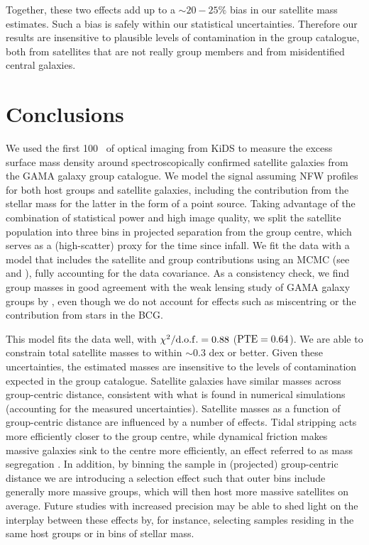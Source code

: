 Together, these two effects add up to a $\sim\!20-25\%$ bias in our satellite mass estimates. 
Such a bias is safely within our statistical uncertainties. Therefore our results are insensitive to 
plausible levels of contamination in the group catalogue, both from satellites that are not really 
group members and from misidentified central galaxies.


\section{Conclusions}\label{s:conclusions}

We used the first 100 \sqdeg\ of optical imaging from KiDS to measure the excess surface mass 
density around spectroscopically confirmed satellite galaxies from the GAMA galaxy group catalogue. 
We model the signal assuming NFW profiles for both host groups and satellite galaxies, including the 
contribution from the stellar mass for the latter in the form of a point source. Taking advantage of 
the combination of statistical power and high image quality, we split the satellite population into 
three bins in projected separation from the group centre, which serves as a (high-scatter) proxy for 
the time since infall. We fit the data with a model that includes the satellite and group 
contributions using an MCMC (see  and ), fully accounting for 
the data covariance. As a consistency check, we find group masses in good agreement with the weak 
lensing study of GAMA galaxy groups by \cite{viola15}, even though we do not account for effects 
such as miscentring or the contribution from stars in the BCG.

This model fits the data well, with $\chi^2/{\rm d.o.f.}=0.88$ (${\rm PTE}=0.64$). We are able to 
constrain total satellite masses to within $\sim0.3$ dex or better. Given these uncertainties, 
the estimated masses are insensitive to the levels of contamination expected in the group 
catalogue. Satellite galaxies have similar masses across group-centric distance, consistent with 
what is found in numerical simulations (accounting for the measured uncertainties). Satellite masses 
as a function of group-centric distance are influenced by a number of effects. Tidal stripping acts 
more efficiently closer to the group centre, while dynamical friction makes massive galaxies sink to 
the centre more efficiently, an effect referred to as mass segregation \citep[e.g.,][]{frenk96}. In 
addition, by binning the sample in (projected) group-centric distance we are introducing a selection 
effect such that outer bins include generally more massive groups, which will then host more massive 
satellites on average. Future studies with increased precision may be able to shed light on the 
interplay between these effects by, for instance, selecting samples residing in the same host groups 
or in bins of stellar mass. 

